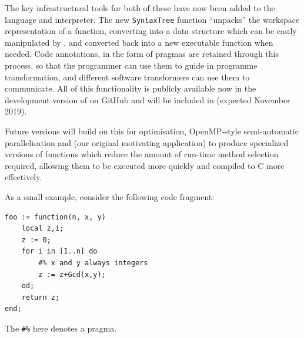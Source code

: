 \documentclass{deliverablereport}
\begin{document}
The key infrastructural tools for both of these have now been added to
the \GAP language and interpreter. The new \verb|SyntaxTree| function
``unpacks'' the workspace representation of a \GAP function,
converting into a data structure which can be easily manipulated by
\GAP, and converted back into a new executable \GAP function when
needed. Code annotations, in the form of pragmas are retained through
this process, so that the programmer can use them to guide in
programme transformation, and different software transformers can use
them to communicate. All of this functionality is publicly available
now in the development version of \GAP on GitHub and will be included
in  (expected November 2019).

Future versions will build on this for optimisation, OpenMP-style
semi-automatic parallelisation and (our original motivating
application) to produce specialized versions of functions which reduce
the amount of run-time method selection required, allowing them to be
executed more quickly and compiled to C more effectively.

As a small example, consider the following code fragment:
\begin{verbatim}
foo := function(n, x, y)
    local z,i;
    z := 0;
    for i in [1..n] do
        #% x and y always integers
        z := z+Gcd(x,y);
    od;
    return z;
end;
\end{verbatim}
The \verb|#%| here denotes a pragma.
\end{document}
